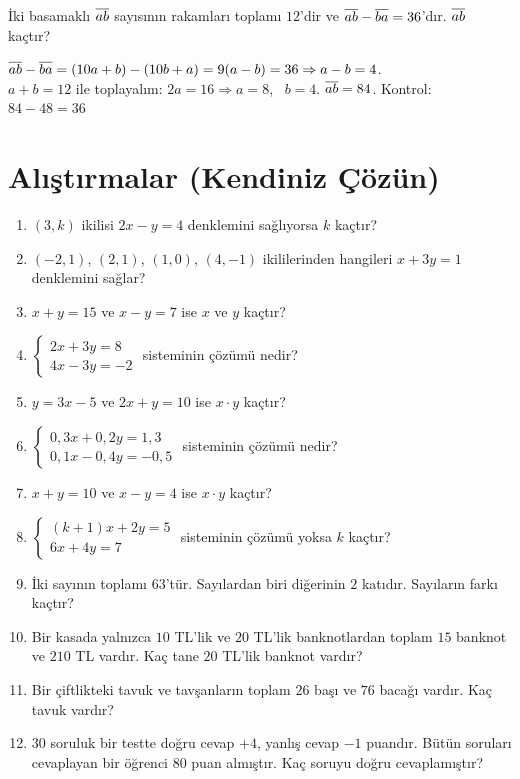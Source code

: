 \begin{alistirma}
İki basamaklı \(\overline{ab}\) sayısının rakamları toplamı \(12\)'dir ve \(\overline{ab}-\overline{ba}=36\)'dır. \(\overline{ab}\) kaçtır?
\end{alistirma}
\begin{cozum}
\(\overline{ab}-\overline{ba}=(10a+b)-(10b+a)=9(a-b)=36\Rightarrow a-b=4\).\\
\(a+b=12\) ile toplayalım: \(2a=16\Rightarrow a=8\), \ \(b=4\). \quad \(\overline{ab}=84\). \quad Kontrol: \(84-48=36\) \checkmark
\end{cozum}

\kendinizoncesi
\section{Alıştırmalar (Kendiniz Çözün)}

\begin{enumerate}[label=\textbf{\arabic*.},leftmargin=*,itemsep=6pt]
\item \((3,k)\) ikilisi \(2x-y=4\) denklemini sağlıyorsa \(k\) kaçtır?
\item \((-2,1)\), \((2,1)\), \((1,0)\), \((4,-1)\) ikililerinden hangileri \(x+3y=1\) denklemini sağlar?
\item \(x+y=15\) ve \(x-y=7\) ise \(x\) ve \(y\) kaçtır?
\item \(\begin{cases}2x+3y=8\\ 4x-3y=-2\end{cases}\) sisteminin çözümü nedir?
\item \(y=3x-5\) ve \(2x+y=10\) ise \(x\cdot y\) kaçtır?
\item \(\begin{cases}0{,}3x+0{,}2y=1{,}3\\ 0{,}1x-0{,}4y=-0{,}5\end{cases}\) sisteminin çözümü nedir?
\item \(x+y=10\) ve \(x-y=4\) ise \(x\cdot y\) kaçtır?
\item \(\begin{cases}(k+1)x+2y=5\\ 6x+4y=7\end{cases}\) sisteminin çözümü yoksa \(k\) kaçtır?
\item İki sayının toplamı \(63\)'tür. Sayılardan biri diğerinin \(2\) katıdır. Sayıların farkı kaçtır?
\item Bir kasada yalnızca \(10\) TL'lik ve \(20\) TL'lik banknotlardan toplam \(15\) banknot ve \(210\) TL vardır. Kaç tane \(20\) TL'lik banknot vardır?
\item Bir çiftlikteki tavuk ve tavşanların toplam \(26\) başı ve \(76\) bacağı vardır. Kaç tavuk vardır?
\item \(30\) soruluk bir testte doğru cevap \(+4\), yanlış cevap \(-1\) puandır. Bütün soruları cevaplayan bir öğrenci \(80\) puan almıştır. Kaç soruyu doğru cevaplamıştır?
\end{enumerate}

